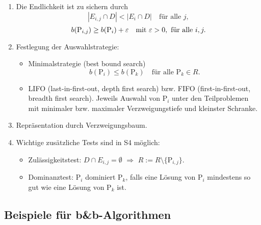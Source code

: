 \begin{rmrk*}
  \begin{enumerate}[(1)]
  \item Die Endlichkeit ist zu sichern durch
    \[ |E_{i,j} \cap D | < | E_i \cap D | \quad \text{für alle } j, \]
    \[ b( \text{P}_{i,j} ) \ge b( \text{P}_i ) + \varepsilon \quad \text{mit } \varepsilon >
      0, \text{ für alle } i, j. \]
  \item Festlegung der Auswahlstrategie:
    \begin{itemize}
    \item Minimalstrategie (best bound search)
      \[ b(\text{P}_i) \le b(\text{P}_k) \quad \text{für alle } \text{P}_k \in
        R. \] 
    \item LIFO (last-in-first-out, depth first search) bzw. FIFO
      (first-in-first-out, breadth first search). Jeweils Auswahl von
      $\text{P}_i$ unter den Teilproblemen mit minimaler bzw. maximaler
      Verzweigungstiefe und kleinster Schranke.
    \end{itemize}
  \item Repräsentation durch Verzweigungsbaum.
  \item Wichtige zusätzliche Tests sind in S4 möglich:
    \begin{itemize}
    \item Zulässigkeitstest: $D \cap E_{i,j} = \emptyset$ $\Rightarrow$ $R := R
      \setminus \{ \text{P}_{i,j} \}$.
    \item Dominanztest: $\text{P}_i$ dominiert $\text{P}_k$, falls eine Lösung
      von $\text{P}_i$ mindestens so gut wie eine Lösung von $\text{P}_k$ ist.
    \end{itemize}
  \end{enumerate}
\end{rmrk*}

\subsection{Beispiele für b\&b-Algorithmen}
